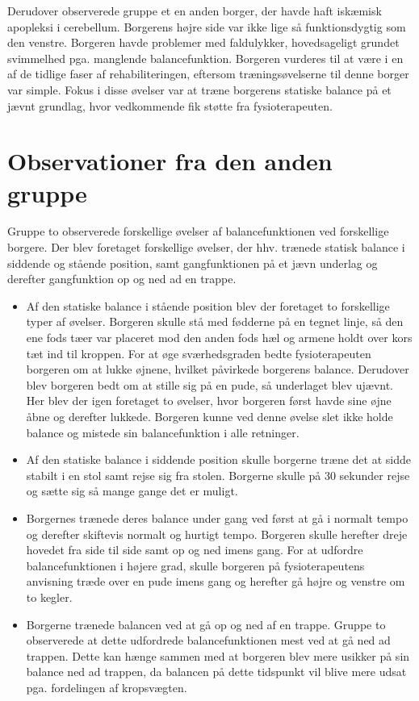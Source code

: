 Derudover observerede gruppe et en anden borger, der havde haft iskæmisk apopleksi i cerebellum. Borgerens højre side var ikke lige så funktionsdygtig som den venstre. Borgeren havde problemer med faldulykker, hovedsageligt grundet svimmelhed pga. manglende balancefunktion. Borgeren vurderes til at være i en af de tidlige faser af rehabiliteringen, eftersom træningsøvelserne til denne borger var simple. Fokus i disse øvelser var at træne borgerens statiske balance på et jævnt grundlag, hvor vedkommende fik støtte fra fysioterapeuten. 

\section{Observationer fra  den anden gruppe}
Gruppe to observerede forskellige øvelser af balancefunktionen ved forskellige borgere. Der blev foretaget forskellige øvelser, der hhv. trænede statisk balance i siddende og stående position, samt gangfunktionen på et jævn underlag og derefter gangfunktion op og ned ad en trappe. 
\begin{itemize}
\item Af den statiske balance i stående position blev der foretaget to forskellige typer af øvelser. Borgeren skulle stå med fødderne på en tegnet linje, så den ene fods tæer var placeret mod den anden fods hæl og armene holdt over kors tæt ind til kroppen. For at øge sværhedsgraden bedte fysioterapeuten borgeren om at lukke øjnene, hvilket påvirkede borgerens balance. Derudover blev borgeren bedt om at stille sig på en pude, så underlaget blev ujævnt. Her blev der igen foretaget to øvelser, hvor borgeren først havde sine øjne åbne og derefter lukkede. Borgeren kunne ved denne øvelse slet ikke holde balance og mistede sin balancefunktion i alle retninger. 
\item Af den statiske balance i siddende position skulle borgerne træne det at sidde stabilt i en stol samt rejse sig fra stolen. Borgerne skulle på 30 sekunder rejse og sætte sig så mange gange det er muligt. 
\item Borgernes trænede deres balance under gang ved først at gå i normalt tempo og derefter skiftevis normalt og hurtigt tempo. Borgeren skulle herefter dreje hovedet fra side til side samt op og ned imens gang. For at udfordre balancefunktionen i højere grad, skulle borgeren på fysioterapeutens anvisning træde over en pude imens gang og herefter gå højre og venstre om to kegler.
\item Borgerne trænede balancen ved at gå op og ned af en trappe. Gruppe to observerede at dette udfordrede balancefunktionen mest ved at gå ned ad trappen. Dette kan hænge sammen med at borgeren blev mere usikker på sin balance ned ad trappen, da balancen på dette tidspunkt vil blive mere udsat pga. fordelingen af kropsvægten. 
\end{itemize} 

